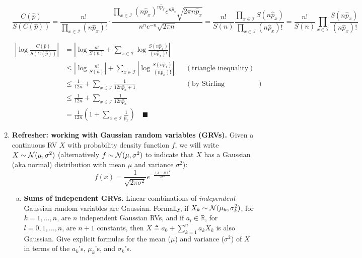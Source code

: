 \documentclass[12pt]{article}
\renewcommand{\hat}[1]{\widehat{#1}}
\newcommand{\R}{\mathbb{R}}
\newcommand{\qed}{\quad \blacksquare}
\newcommand{\abs}[1]{\left\vert #1 \right\vert}
\begin{document}
\begin{enumerate}[1.]
	      \color{blue}
	      \[ \frac{C(\hat p)}{S(C(\hat p))}
		      = \frac{n!}{\prod_{x \in \mathcal{I}} (n\hat p_x)!}\cdot \frac{\prod_{x \in \mathcal{I}} (n\hat p_x)^{n\hat p_x} e^{n\hat p_x} \sqrt{2\pi n \hat p_x}}{n^n e^{-n} \sqrt{2\pi n}}
		      = \frac{n!}{S(n)} \frac{\prod_{x \in \mathcal{I}} S(n\hat p_x)}{\prod_{x \in \mathcal{I}}  (n \hat p_x)! }
		      = \frac{n!}{S(n)} \prod_{x \in \mathcal{I}} \frac{S(n\hat p_x)}{(n \hat p_x)!} \]

	      \begin{align*}
		      \abs{\log \frac{C(\hat p)}{S(C(\hat p))}} & = \abs{\log \frac{n!}{S(n)} + \sum_{x \in \mathcal{I}} \log \frac{S(n\hat p_x)}{(n \hat p_x)!}}                                                   \\
		                                                & \leq \abs{\log \frac{n!}{S(n)} } + \sum_{x \in \mathcal{I}} \abs{\log \frac{S(n\hat p_x)}{(n \hat p_x)!}} &  & (\text{triangle inequality})       \\
		                                                & \leq \frac{1}{12n} + \sum_{x \in \mathcal{I}} \frac{1}{12n \hat p_x + 1}                                  &  & (\text{by Stirling approximation}) \\
		                                                & \leq \frac{1}{12n} + \sum_{x \in \mathcal{I}} \frac{1}{12n \hat p_x}                                                                              \\
		                                                & = \frac{1}{12n} \left(1 + \sum_{x \in \mathcal{I}} \frac{1}{\hat p_x}\right) \qed
	      \end{align*}
	      \color{black}

	      \pagebreak

	\item {\bf Refresher: working with Gaussian random variables (GRVs).} Given a continuous RV $X$ with probability density function $f$, we will write $X\sim {\cal N}(\mu,\sigma^2)$ (alternatively $f \sim {\cal N}(\mu,\sigma^2)$ to indicate that $X$ has a Gaussian (aka normal) distribution with mean $\mu$ and variance $\sigma^2$):
	      \[
		      f(x) = \frac{1}{\sqrt{2\pi \sigma^2}}e^{-\frac{(x-\mu)^2}{2\sigma^2}}
	      \]
	      \begin{enumerate}[(a)]
		      \item {\bf Sums of independent GRVs.}
		            Linear combinations of {\em independent} Gaussian random variables are Gaussian. Formally, if $X_k\sim{\cal N}(\mu_k,\sigma_k^2)$, for $k=1,\ldots,n$, are $n$ independent Gaussian RVs, and if $a_l \in\R$, for $l=0,1,\ldots,n$, are $n+1$ constants, then $X \triangleq a_0 + \sum_{k=1}^n a_k X_k$ is also Gaussian. Give explicit formulas for the mean ($\mu$) and variance ($\sigma^2$) of $X$ in terms of the $a_k$'s, $\mu_k$'s, and $\sigma_k$'s.


\end{enumerate}
\end{enumerate}
\end{document}

